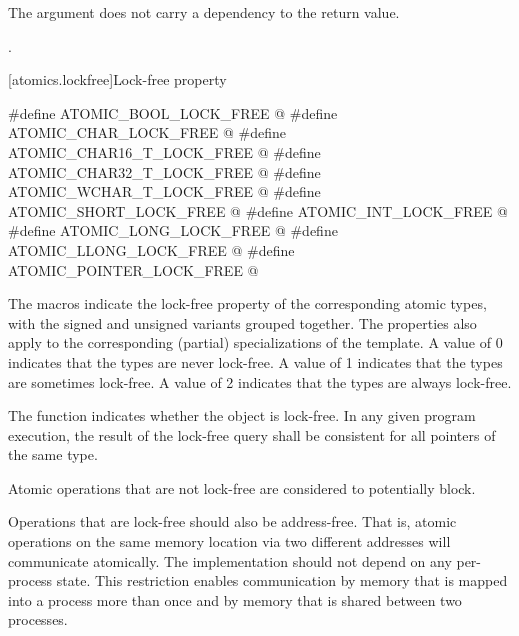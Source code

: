 \begin{itemdescr}
\pnum
\effects The argument does not carry a dependency to the return
value.

\pnum
\returns {}.
\end{itemdescr}


[atomics.lockfree]{Lock-free property}

%
%
%
%
%
%
%
%
%
%
\begin{codeblock}
#define ATOMIC_BOOL_LOCK_FREE @\unspec@
#define ATOMIC_CHAR_LOCK_FREE @\unspec@
#define ATOMIC_CHAR16_T_LOCK_FREE @\unspec@
#define ATOMIC_CHAR32_T_LOCK_FREE @\unspec@
#define ATOMIC_WCHAR_T_LOCK_FREE @\unspec@
#define ATOMIC_SHORT_LOCK_FREE @\unspec@
#define ATOMIC_INT_LOCK_FREE @\unspec@
#define ATOMIC_LONG_LOCK_FREE @\unspec@
#define ATOMIC_LLONG_LOCK_FREE @\unspec@
#define ATOMIC_POINTER_LOCK_FREE @\unspec@
\end{codeblock}

\pnum
The  macros indicate the lock-free property of the
corresponding atomic types, with the signed and unsigned variants grouped
together. The properties also apply to the corresponding (partial) specializations of the
 template. A value of 0 indicates that the types are never
lock-free. A value of 1 indicates that the types are sometimes lock-free. A
value of 2 indicates that the types are always lock-free.

\pnum
The function 
indicates whether the object is lock-free. In any given program execution, the
result of the lock-free query shall be consistent for all pointers of the same
type.

\pnum
Atomic operations that are not lock-free are considered to potentially
block.

\pnum
\begin{note} Operations that are lock-free should also be address-free. That is,
atomic operations on the same memory location via two different addresses will
communicate atomically. The implementation should not depend on any
per-process state. This restriction enables communication  by memory that is
mapped into a process more than once and by memory that is shared between two
processes. \end{note}

